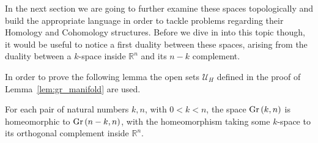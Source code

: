 In the next section we are going to further examine these spaces topologically and build the appropriate language in order to tackle problems regarding their Homology and Cohomology structures. Before we dive in into this topic though, it would be useful to notice a first duality between these spaces, arising from the duality between a $k$-space inside $\mathbb{R}^n$ and its $n-k$ complement.

In order to prove the following lemma the open sets $\mathcal{U}_H$ defined in the proof of Lemma~\ref{lem:gr_manifold} are used.

\begin{lemma} \label{lem:gr_duality}
	For each pair of natural numbers $k,n$, with $0<k<n$, the space $\Gr{k}{n}$ is homeomorphic to $\Gr{n-k}{n}$, with the homeomorphism taking some $k$-space to its orthogonal complement inside $\mathbb{R}^n$.
\end{lemma}

